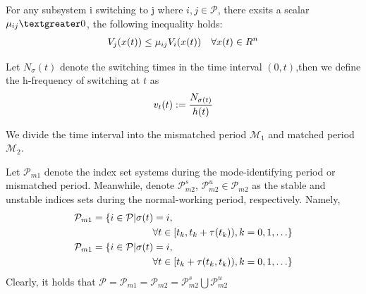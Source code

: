 \documentclass[twocolumn]{autart}    %
\begin{document}
\begin{assum}
    For any subsystem i switching to j where $i,j \in \mathcal{P}$, there exsits a scalar $\mu_{ij} \textgreater 0$, the following inequality holds:
    \begin{equation}
            \begin{aligned}
                \setlength{\arraycolsep}{0.9pt}
                V_{j}(x(t)) \le \mu_{ij}V_{i}(x(t)) \quad \forall x(t) \in R^{n}
            \end{aligned}
        \end{equation}
    \end{assum}

\begin{defn}
    Let $N_{\sigma}(t)$ denote the switching times in the time interval $(0,t)$,then we define the h-frequency of switching at $t$ as
    \begin{equation}
        \begin{aligned}
            \setlength{\arraycolsep}{0.9pt}
            v_{t}(t) := \frac{N_{\sigma(t)}}{h(t)}
        \end{aligned}
    \end{equation}
\end{defn}

\begin{defn}
We divide the time interval into the mismatched period $\mathcal{M}_{1}$ and matched period $\mathcal{M}_{2}$.

Let $\mathcal{P}_{m1}$ denote the index set systems during the mode-identifying period or mismatched period. Meanwhile, denote
$\mathcal{P}_{m2}^{s}$, $\mathcal{P}_{m2}^{u} \in \mathcal{P}_{m2}$ as the stable and unstable indices sets during the normal-working period, respectively. Namely,
\begin{equation}
    \begin{aligned}
        \setlength{\arraycolsep}{0.9pt}
        &\mathcal{P}_{m1} = \{i \in \mathcal{P} | \sigma(t) = i,\\
        &\qquad \qquad \qquad \qquad  \forall t \in [t_{k},t_{k}+\tau(t_{k})),k = 0,1,\ldots\}\\
        &\mathcal{P}_{m1} = \{i \in \mathcal{P} | \sigma(t) = i,\\
        &\qquad \qquad \qquad \qquad\forall t \in [t_{k}+\tau(t_{k},t_{k})),k = 0,1,\ldots\}
    \end{aligned}
\end{equation}
Clearly, it holds that $\mathcal{P} = \mathcal{P}_{m1} = \mathcal{P}_{m2} = \mathcal{P}_{m2}^{s}\bigcup \mathcal{P}_{m2}^{u}$
\end{defn}
\end{document}
